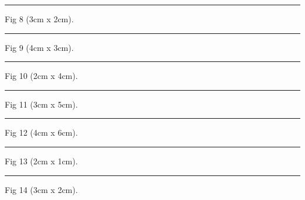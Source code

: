 \documentclass[a4paper,11pt]{article}
\begin{document}
\begin{swarmwrap}%
  \begin{minipage}[t]{3cm}
    \centering
    \rule{\linewidth}{2cm}
    {\footnotesize Fig 8 (3cm x 2cm).}
  \end{minipage}%
\end{swarmwrap}%
\swarmwrapnext
\lipsum[8]%

\begin{swarmwrap}%
  \begin{minipage}[t]{4cm}
    \centering
    \rule{\linewidth}{3cm}
    {\footnotesize Fig 9 (4cm x 3cm).}
  \end{minipage}%
\end{swarmwrap}%
\swarmwrapnext
\lipsum[9]%

\begin{swarmwrap}%
  \begin{minipage}[t]{2cm}
    \centering
    \rule{\linewidth}{4cm}
    {\footnotesize Fig 10 (2cm x 4cm).}
  \end{minipage}%
\end{swarmwrap}%
\swarmwrapnext
\lipsum[10]%

\begin{swarmwrap}%
  \begin{minipage}[t]{3cm}
    \centering
    \rule{\linewidth}{5cm}
    {\footnotesize Fig 11 (3cm x 5cm).}
  \end{minipage}%
\end{swarmwrap}%
\swarmwrapnext
\lipsum[11]%

\begin{swarmwrap}%
  \begin{minipage}[t]{4cm}
    \centering
    \rule{\linewidth}{6cm}
    {\footnotesize Fig 12 (4cm x 6cm).}
  \end{minipage}%
\end{swarmwrap}%
\swarmwrapnext
\lipsum[12]%

\begin{swarmwrap}%
  \begin{minipage}[t]{2cm}
    \centering
    \rule{\linewidth}{1cm}
    {\footnotesize Fig 13 (2cm x 1cm).}
  \end{minipage}%
\end{swarmwrap}%
\swarmwrapnext
\lipsum[13]%

\begin{swarmwrap}%
  \begin{minipage}[t]{3cm}
    \centering
    \rule{\linewidth}{2cm}
    {\footnotesize Fig 14 (3cm x 2cm).}
  \end{minipage}%
\end{swarmwrap}%
\swarmwrapnext
\lipsum[14]%
\end{document}
